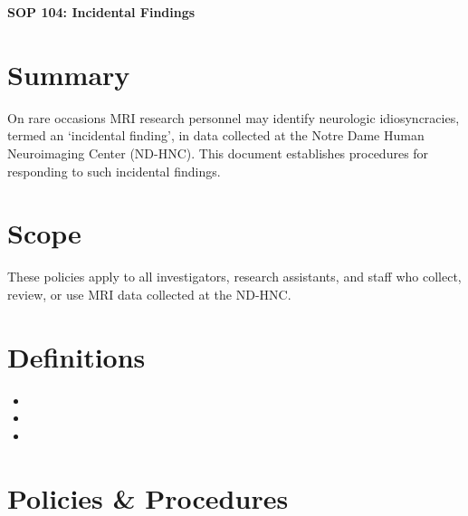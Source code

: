 \documentclass[11pt]{article}
\begin{document}
\renewcommand{\labelenumii}{\arabic{enumi}.\arabic{enumii}}
\renewcommand{\labelenumiii}{\arabic{enumi}.\arabic{enumii}.\arabic{enumiii}}
\renewcommand{\labelenumiv}{\arabic{enumi}.\arabic{enumii}.\arabic{enumiii}.\arabic{enumiv}}

\begin{center}
	\textbf{\Large SOP 104: Incidental Findings}\\
	\hrulefill
\end{center}


\section{Summary}
On rare occasions MRI research personnel may identify neurologic idiosyncracies, termed an `incidental finding', in data collected at the Notre Dame Human Neuroimaging Center (ND-HNC). This document establishes procedures for responding to such incidental findings.

\section{Scope}
These policies apply to all investigators, research assistants, and staff who collect, review, or use MRI data collected at the ND-HNC.

\section{Definitions}

\begin{itemize}
    \item \DICOM
    \item \IRB
    \item \Operator
\end{itemize}


\section{Policies \& Procedures}


\end{document}

